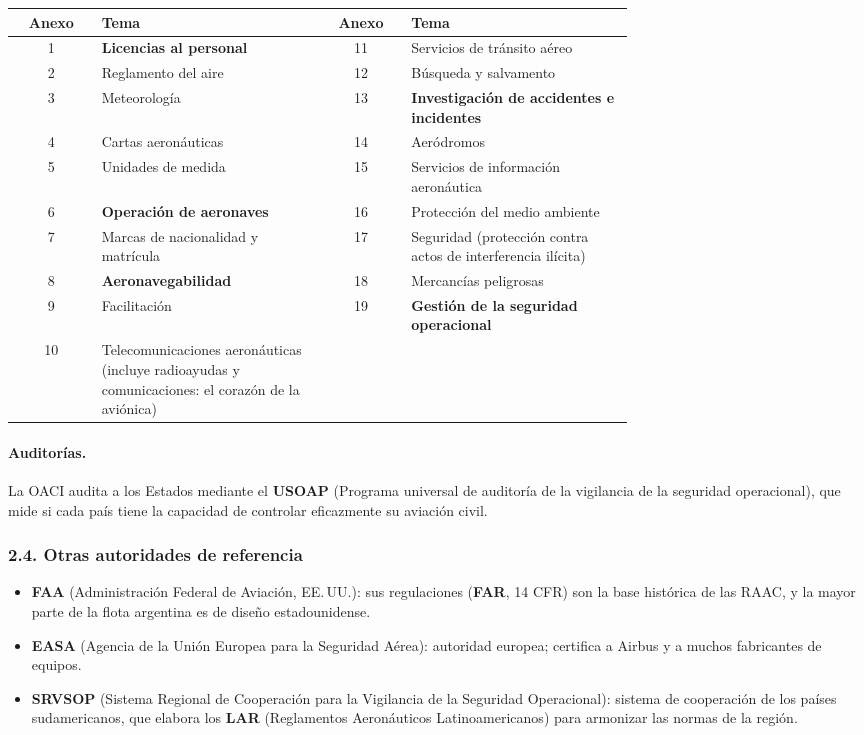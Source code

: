 \begin{center}
\small
\begin{tabular}{|c|p{0.36\linewidth}||c|p{0.36\linewidth}|}
\hline
\textbf{Anexo} & \textbf{Tema} & \textbf{Anexo} & \textbf{Tema} \\ \hline
1 & \textbf{Licencias al personal} & 11 & Servicios de tránsito aéreo \\ \hline
2 & Reglamento del aire & 12 & Búsqueda y salvamento \\ \hline
3 & Meteorología & 13 & \textbf{Investigación de accidentes e incidentes} \\ \hline
4 & Cartas aeronáuticas & 14 & Aeródromos \\ \hline
5 & Unidades de medida & 15 & Servicios de información aeronáutica \\ \hline
6 & \textbf{Operación de aeronaves} & 16 & Protección del medio ambiente \\ \hline
7 & Marcas de nacionalidad y matrícula & 17 & Seguridad (protección contra actos de
interferencia ilícita) \\ \hline
8 & \textbf{Aeronavegabilidad} & 18 & Mercancías peligrosas \\ \hline
9 & Facilitación & 19 & \textbf{Gestión de la seguridad operacional} \\ \hline
10 & Telecomunicaciones aeronáuticas (incluye radioayudas y comunicaciones: el corazón de la
aviónica) & & \\ \hline
\end{tabular}
\end{center}

\paragraph*{Auditorías.}
La OACI audita a los Estados mediante el \textbf{USOAP} (Programa universal de auditoría de la
vigilancia de la seguridad operacional), que mide si cada país tiene la capacidad de controlar
eficazmente su aviación civil.

\subsubsection*{2.4. Otras autoridades de referencia}
\begin{itemize}
  \item \textbf{FAA} (Administración Federal de Aviación, EE.\,UU.): sus regulaciones (\textbf{FAR},
        14 CFR) son la base histórica de las RAAC, y la mayor parte de la flota argentina es de
        diseño estadounidense.
  \item \textbf{EASA} (Agencia de la Unión Europea para la Seguridad Aérea): autoridad europea;
        certifica a Airbus y a muchos fabricantes de equipos.
  \item \textbf{SRVSOP} (Sistema Regional de Cooperación para la Vigilancia de la Seguridad
        Operacional): sistema de cooperación de los países sudamericanos, que elabora los
        \textbf{LAR} (Reglamentos Aeronáuticos Latinoamericanos) para armonizar las normas de la
        región.
\end{itemize}

